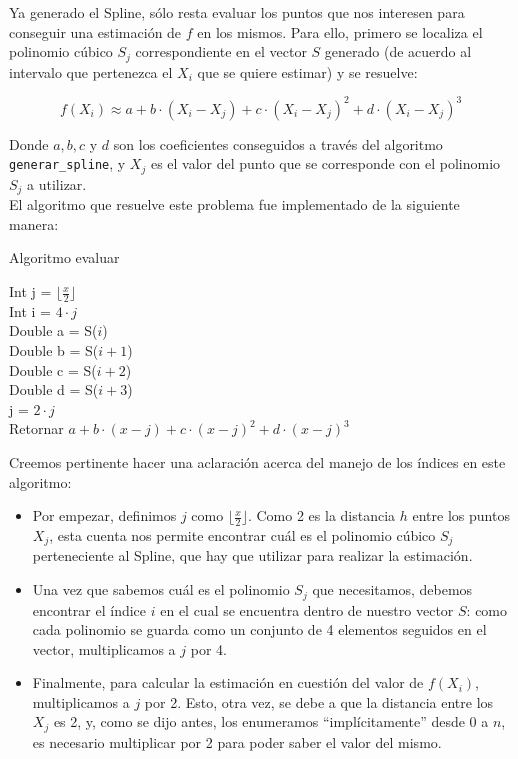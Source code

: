 \documentclass[a4paper]{article}
\begin{document}
Ya generado el Spline, sólo resta evaluar los puntos que nos interesen para conseguir una estimación de $f$ en los mismos. Para ello, primero se localiza el polinomio cúbico $S_j$ correspondiente en el vector $S$ generado (de acuerdo al intervalo que pertenezca el $X_i$ que se quiere estimar) y se resuelve:

\[f(X_i) \approx a+b\cdot (X_i - X_j)+c \cdot (X_i - X_j)^{2} + d \cdot (X_i - X_j)^{3}\]

\bigskip
Donde $a, b, c$ y $d$ son los coeficientes conseguidos a través del algoritmo \texttt{generar_spline}, y $X_j$ es el valor del punto que se corresponde con el polinomio $S_j$ a utilizar. \\
\indent El algoritmo que resuelve este problema fue implementado de la siguiente manera:
\pagebreak

\IncMargin{1em}
\begin{algorithm}[h!]
\NoCaptionOfAlgo
\caption{Algoritmo evaluar}

\bigskip

Int j = $\lfloor \frac{x}{2} \rfloor$ \\
Int i = $4 \cdot j$ \\
\bigskip
Double a = S($i$)\\
Double b = S($i+1$)\\
Double c = S($i+2$)\\
Double d = S($i+3$)\\
\bigskip
j = $2 \cdot j$\\
\bigskip
Retornar $a+b\cdot (x - j)+c \cdot (x - j)^{2} + d \cdot (x - j)^{3}$
\end{algorithm}\DecMargin{1em}

\bigskip
Creemos pertinente hacer una aclaración acerca del manejo de los índices en este algoritmo:
\begin{itemize}
\item Por empezar, definimos $j$ como $\lfloor \frac{x}{2} \rfloor$. Como 2 es la distancia $h$ entre los puntos $X_j$, esta cuenta nos permite encontrar cuál es el polinomio cúbico $S_j$ perteneciente al Spline, que hay que utilizar para realizar la estimación.
\item Una vez que sabemos cuál es el polinomio $S_j$ que necesitamos, debemos encontrar el índice $i$ en el cual se encuentra dentro de nuestro vector $S$: como cada polinomio se guarda como un conjunto de 4 elementos seguidos en el vector, multiplicamos a $j$ por 4.
\item Finalmente, para calcular la estimación en cuestión del valor de $f(X_i)$, multiplicamos a $j$ por 2. Esto, otra vez, se debe a que la distancia entre los $X_j$ es 2, y, como se dijo antes, los enumeramos ``implícitamente'' desde 0 a $n$, es necesario multiplicar por 2 para poder saber el valor del mismo.
\end{itemize}
\end{document}
